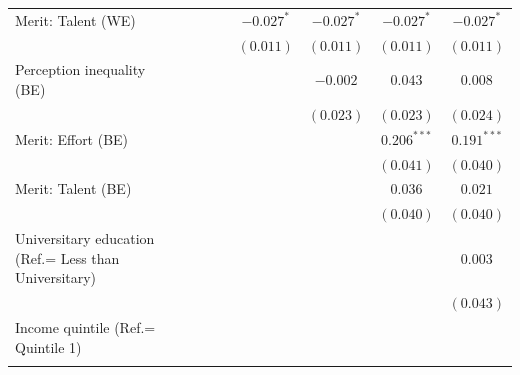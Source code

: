 \documentclass[
  12pt,
]{article}
\begin{document}
\begin{table}
\begin{center}
{\begin{tabular}{l c c c c c c c c}
Merit: Talent (WE)                                    &               &                &                &                & $-0.027^{*}$   & $-0.027^{*}$   & $-0.027^{*}$   & $-0.027^{*}$   \\
                                                      &               &                &                &                & $(0.011)$      & $(0.011)$      & $(0.011)$      & $(0.011)$      \\
Perception inequality (BE)                            &               &                &                &                &                & $-0.002$       & $0.043$        & $0.008$        \\
                                                      &               &                &                &                &                & $(0.023)$      & $(0.023)$      & $(0.024)$      \\
Merit: Effort (BE)                                    &               &                &                &                &                &                & $0.206^{***}$  & $0.191^{***}$  \\
                                                      &               &                &                &                &                &                & $(0.041)$      & $(0.040)$      \\
Merit: Talent (BE)                                    &               &                &                &                &                &                & $0.036$        & $0.021$        \\
                                                      &               &                &                &                &                &                & $(0.040)$      & $(0.040)$      \\
Universitary education (Ref.= Less than Universitary) &               &                &                &                &                &                &                & $0.003$        \\
                                                      &               &                &                &                &                &                &                & $(0.043)$      \\
Income quintile (Ref.= Quintile 1)                    &               &                &                &                &                &                &                &                \\
                                                      &               &                &                &                &                &                &                &                \\

\end{tabular}}
\end{center}
\end{table}
\end{document}
